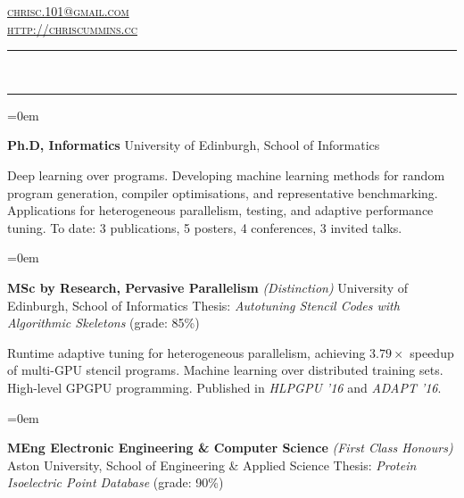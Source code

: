 \documentclass[a4paper,11pt,hidelinks]{scrartcl}
\date{}
\newcommand{\MarginText}[1]{\marginpar{\raggedleft\itshape\normalsize#1}}
\newcommand{\Title}[1]{\noindent\rule{15cm}{0.4pt}\vspace{-.45em}\\
\noindent\spacedlowsmallcaps{\color{titlecolour}{#1}}

\vspace{-.85em}\noindent\rule{15cm}{0.4pt}\vspace{.2em}}
\newcommand{\Description}[1]{\hangindent=0em\hangafter=0%
\noindent\normalsize{#1}\vspace{1em}}
\begin{document}
\thispagestyle{empty}


\begin{cv}%
%
{} %

\begin{flushright}
\vspace{-3.1em}
\hfill \noindent \href{mailto:chrisc.101@gmail.com}{\textsc{chrisc.101@gmail.com}}\\%
\vspace{-.35em}
\hfill \noindent \href{http://chriscummins.cc}{\textsc{http://chriscummins.cc}}\\%
\end{flushright}
\vspace{-1em}

\Title{Education}

\Description{\MarginText{2019\\(expected)}\textbf{Ph.D, Informatics}
  \newline University of Edinburgh, School of Informatics
  \newline\vspace{-.8em}

  \noindent %
  Deep learning over programs. Developing machine learning methods for random program generation, compiler optimisations, and representative benchmarking. Applications for heterogeneous parallelism, testing, and adaptive performance tuning. To date: 3 publications, 5 posters, 4 conferences, 3 invited talks.%
}

\Description{\MarginText{2015}\textbf{MSc by Research, Pervasive Parallelism}
  \textit{(Distinction)}
  \newline University of Edinburgh, School of Informatics
  \newline Thesis: \textit{Autotuning Stencil Codes with Algorithmic
    Skeletons} (grade: 85\%)
  \newline\vspace{-.8em}

  \noindent %
  Runtime adaptive tuning for heterogeneous parallelism, achieving $3.79\times$ speedup of multi-GPU stencil programs. Machine learning over distributed training sets. High-level GPGPU programming. Published in \textit{HLPGPU '16} and \textit{ADAPT '16}.%
}

\Description{\MarginText{2014}\textbf{MEng Electronic Engineering \& Computer Science}
  \textit{(First Class Honours)}
  \newline Aston University, School of Engineering \& Applied Science
  \newline Thesis: \textit{Protein Isoelectric Point Database} (grade: 90\%)
  \newline\vspace{-.8em}

}
\end{cv}
\end{document}
